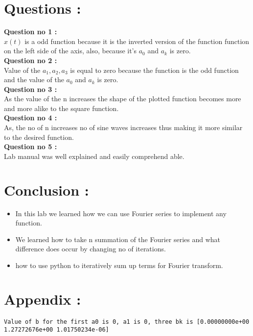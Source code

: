 \documentclass{article}
\begin{document}
\section{Questions :}
\textbf{Question no 1 :}
\\$x(t)$ is a odd function because it is the inverted version of the function function on the left side of the axis, also, because it's $a_0$ and $a_k$ is zero.
\\ \textbf{Question no 2 :}
\\Value of the $a_1,a_2,a_3$ is equal to zero because the function is the odd function and the value of the $a_0$ and $a_k$ is zero.
\\ \textbf{Question no 3 :}
\\As the value of the n increases the shape of the plotted function becomes more and more alike to the square function.
\\ \textbf{Question no 4 :}
\\ As, the no of n increases no of sine waves increases thus making it more similar to the desired function.
\\ \textbf{Question no 5 :}
\\ Lab manual was well explained and easily comprehend able.

\section{Conclusion :}
\begin{itemize}
\item In this lab we learned how we can use Fourier series to implement any function.
\item We learned how to take n summation of the Fourier series and what difference does occur by changing no of iterations.
\item how to use python to iteratively sum up terms for Fourier transform.
\end{itemize} 
\section{Appendix :}
\begin{verbatim}
Value of b for the first a0 is 0, a1 is 0, three bk is [0.00000000e+00 1.27272676e+00 1.01750234e-06]
\end{verbatim}
\end{document}
